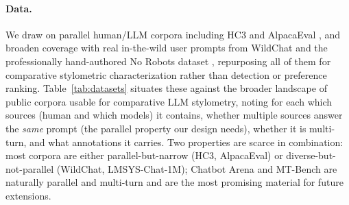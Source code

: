 \documentclass[11pt]{article}
\begin{document}
\paragraph{Data.}
We draw on parallel human/LLM corpora including HC3 \citep{guo2023hc3} and
AlpacaEval \citep{alpacaeval2023}, and broaden coverage with real in-the-wild user
prompts from WildChat \citep{zhao2024wildchat} and the professionally
hand-authored No Robots dataset \citep{norobots2023}, repurposing all of them for
comparative stylometric characterization rather than detection or preference
ranking. Table~\ref{tab:datasets} situates these against the broader landscape of
public corpora usable for comparative LLM stylometry, noting for each which sources
(human and which models) it contains, whether multiple sources answer the
\emph{same} prompt (the parallel property our design needs), whether it is
multi-turn, and what annotations it carries. Two properties are scarce in
combination: most corpora are either parallel-but-narrow (HC3, AlpacaEval) or
diverse-but-not-parallel (WildChat, LMSYS-Chat-1M); Chatbot Arena and MT-Bench
\citep{zheng2024lmsyschat1m,zheng2023mtbench} are naturally parallel and multi-turn
and are the most promising material for future extensions.
\end{document}
